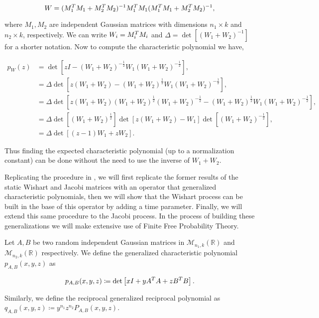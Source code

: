 \begin{equation*}
    W = (M_1^TM_1 + M_2^TM_2)^{-1}M_1^TM_1(M_1^TM_1 + M_2^TM_2)^{-1},
\end{equation*}

\noindent where $M_1, M_2$ are independent Gaussian matrices with dimensions $n_1\times k$ and $n_2 \times k$, respectively.  We can write $W_i = M_i^TM_i$ and $\Delta=\det\left[(W_1+W_2)^{-1}\right]$ for a shorter notation. Now to compute the characteristic polynomial we have,

\begin{align*}
    p_W(z) &= \det\left[ zI - (W_1+W_2)^{-\frac12}W_1(W_1+W_2)^{-\frac12} \right], \\ 
    &= \Delta\det\left[ z(W_1+W_2) - (W_1+W_2)^{\frac12}W_1(W_1+W_2)^{-\frac12} \right],\\ 
    &= \Delta\det\left[ z(W_1+W_2)(W_1+W_2)^{\frac12}(W_1+W_2)^{-\frac12} - (W_1+W_2)^{\frac12}W_1(W_1+W_2)^{-\frac12} \right], \\
    &= \Delta\det\left[(W_1+W_2)^{\frac12}\right]\det\left[ z(W_1 + W_2) - W_1\right]\det\left[(W_1+W_2)^{-\frac12}\right],\\ 
    &= \Delta\det\left[ (z-1)W_1 + zW_2 \right].
\end{align*}

Thus finding the expected characteristic polynomial (up to a normalization constant) can be done without the need to use the inverse of $W_1 + W_2$.



Replicating the procedure in \cite{article:marcus_finite_free_point_processes}, we will first replicate the former results of the static Wishart and Jacobi matrices with an operator that generalized characteristic polynomials, then we will show that the Wishart process can be built in the base of this operator by adding a time parameter. Finally, we will extend this same procedure to the Jacobi process. In the process of building these generalizations we will make extensive use of Finite Free Probability Theory.

\begin{definition}
    Let $A, B$ be two random independent Gaussian matrices in $\mathcal M_{n_1,k}(\mathbb R)$ and $\mathcal M_{n_2,k}(\mathbb R)$ respectively. We define the generalized characteristic polynomial $p_{A,B}(x,y,z)$ as

    \begin{equation*}
        p_{A,B}(x,y,z) \coloneqq \det\left[ xI + y A^TA + z B^TB \right].
    \end{equation*}

    Similarly, we define the reciprocal generalized reciprocal polynomial as $q_{A,B}(x,y,z) \coloneqq y^{n_1}z^{n_2}P_{A,B}(x,y,z)$.
\end{definition}

